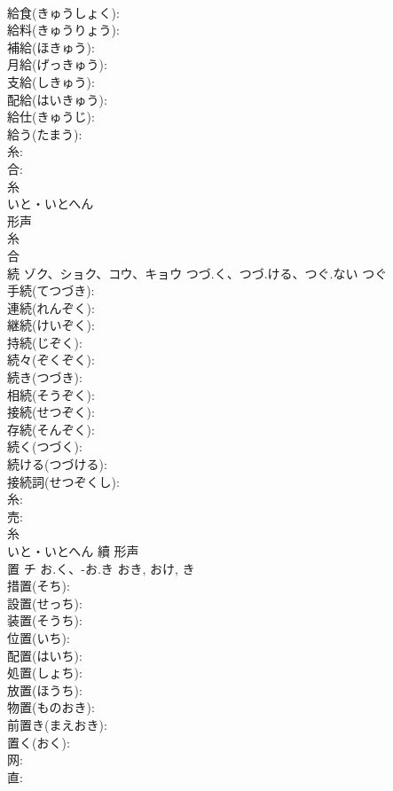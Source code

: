 \documentclass[8pt]{extreport}
\begin{document}
\begin{CJK}{UTF8}{min}
\\	給食(きゅうしょく): 
\\	給料(きゅうりょう): 
\\	補給(ほきゅう): 
\\	月給(げっきゅう): 
\\	支給(しきゅう): 
\\	配給(はいきゅう): 
\\	給仕(きゅうじ): 
\\	給う(たまう): 
\\	糸: 
\\	合: 
\\	糸	
\\	いと・いとへん	
\\	形声 
\\	糸 
\\	合 
\\	続	ゾク、ショク、コウ、キョウ	つづ.く、つづ.ける、つぐ.ない	つぐ	
\\	手続(てつづき): 
\\	連続(れんぞく): 
\\	継続(けいぞく): 
\\	持続(じぞく): 
\\	続々(ぞくぞく): 
\\	続き(つづき): 
\\	相続(そうぞく): 
\\	接続(せつぞく): 
\\	存続(そんぞく): 
\\	続く(つづく): 
\\	続ける(つづける): 
\\	接続詞(せつぞくし): 
\\	糸: 
\\	売: 
\\	糸	
\\	いと・いとへん	續	形声 
\\	置	チ	お.く、-お.き	おき, おけ, き	
\\	措置(そち): 
\\	設置(せっち): 
\\	装置(そうち): 
\\	位置(いち): 
\\	配置(はいち): 
\\	処置(しょち): 
\\	放置(ほうち): 
\\	物置(ものおき): 
\\	前置き(まえおき): 
\\	置く(おく): 
\\	网: 
\\	直: 

\end{CJK}
\end{document}
